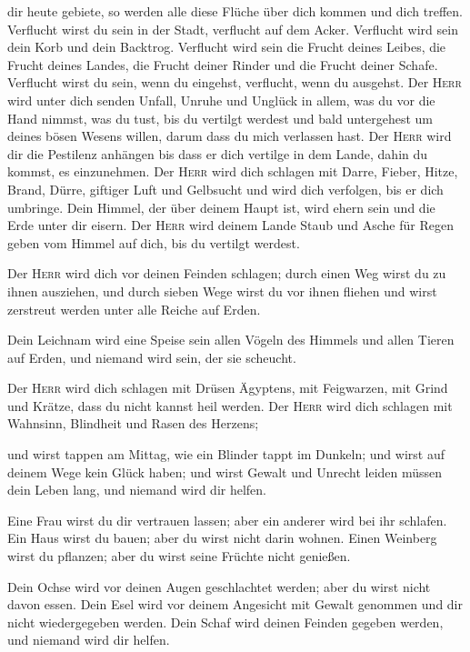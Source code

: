 dir heute gebiete, so werden alle diese Flüche über dich kommen und dich
treffen.  Verflucht wirst du sein in der Stadt, verflucht
auf dem Acker.  Verflucht wird sein dein Korb und dein
Backtrog.  Verflucht wird sein die Frucht deines Leibes,
die Frucht deines Landes, die Frucht deiner Rinder und die Frucht deiner
Schafe.  Verflucht wirst du sein, wenn du eingehst,
verflucht, wenn du ausgehst.  Der \textsc{Herr} wird
unter dich senden Unfall, Unruhe und Unglück in allem, was du vor die
Hand nimmst, was du tust, bis du vertilgt werdest und bald untergehest
um deines bösen Wesens willen, darum dass du mich verlassen hast.
 Der \textsc{Herr} wird dir die Pestilenz anhängen bis
dass er dich vertilge in dem Lande, dahin du kommst, es einzunehmen.
 Der \textsc{Herr} wird dich schlagen mit Darre, Fieber,
Hitze, Brand, Dürre, giftiger Luft und Gelbsucht und wird dich
verfolgen, bis er dich umbringe.  Dein Himmel, der über
deinem Haupt ist, wird ehern sein und die Erde unter dir eisern.
 Der \textsc{Herr} wird deinem Lande Staub und Asche für
Regen geben vom Himmel auf dich, bis du vertilgt werdest.

 Der \textsc{Herr} wird dich vor deinen Feinden schlagen;
durch einen Weg wirst du zu ihnen ausziehen, und durch sieben Wege wirst
du vor ihnen fliehen und wirst zerstreut werden unter alle Reiche auf
Erden.

 Dein Leichnam wird eine Speise sein allen Vögeln des
Himmels und allen Tieren auf Erden, und niemand wird sein, der sie
scheucht.

 Der \textsc{Herr} wird dich schlagen mit Drüsen
Ägyptens, mit Feigwarzen, mit Grind und Krätze, dass du nicht kannst
heil werden.  Der \textsc{Herr} wird dich schlagen mit
Wahnsinn, Blindheit und Rasen des Herzens;

 und wirst tappen am Mittag, wie ein Blinder tappt im
Dunkeln; und wirst auf deinem Wege kein Glück haben; und wirst Gewalt
und Unrecht leiden müssen dein Leben lang, und niemand wird dir helfen.

 Eine Frau wirst du dir vertrauen lassen; aber ein
anderer wird bei ihr schlafen. Ein Haus wirst du bauen; aber du wirst
nicht darin wohnen. Einen Weinberg wirst du pflanzen; aber du wirst
seine Früchte nicht genießen.

 Dein Ochse wird vor deinen Augen geschlachtet werden;
aber du wirst nicht davon essen. Dein Esel wird vor deinem Angesicht mit
Gewalt genommen und dir nicht wiedergegeben werden. Dein Schaf wird
deinen Feinden gegeben werden, und niemand wird dir helfen.

